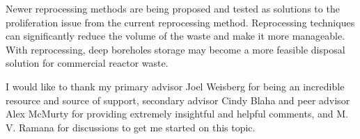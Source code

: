 \documentclass[nofootinbib,preprint,aps]{revtex4-1}
\begin{document}
Newer reprocessing methods are being proposed and tested
as  solutions to the proliferation issue from the current reprocessing method.
 Reprocessing techniques can significantly reduce the volume of the waste and make it more
manageable. With reprocessing, deep boreholes storage may become a more feasible disposal solution 
for commercial reactor waste. 

\begin{acknowledgments}
I would like to thank my primary advisor Joel Weisberg for being an incredible resource and
source of support, secondary advisor Cindy Blaha and peer advisor Alex McMurty for providing extremely
insightful and helpful comments, and M. V. Ramana for discussions to get me started on this topic.
\end{acknowledgments}
\newpage


\end{document}
